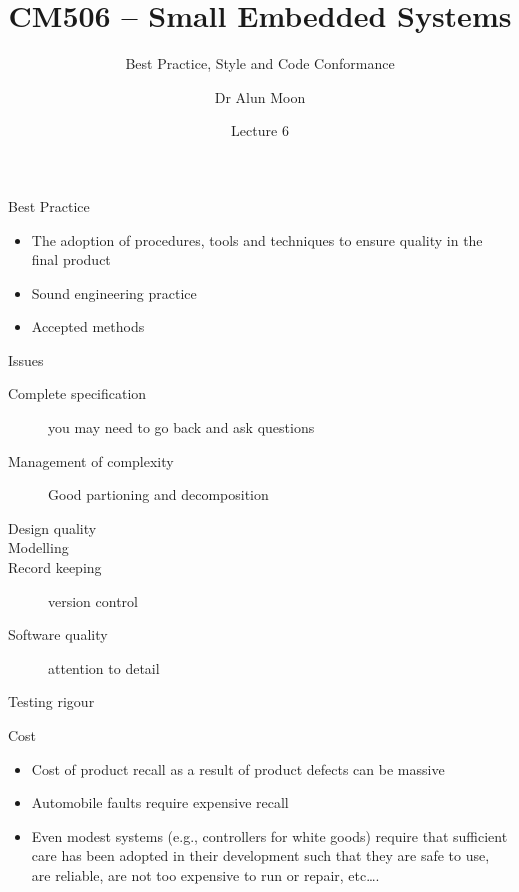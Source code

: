 \documentclass{beamer}
\title{CM506 -- Small Embedded Systems}
\subtitle{Best Practice, Style and Code Conformance}
\author{Dr Alun Moon}
\institute[CSDT]{Department of Computer Science and Digital Technology}
\date{Lecture 6}
\begin{document}
\frame\maketitle


\begin{frame}{Best Practice}
  \begin{itemize}
  \item The adoption of procedures, tools and techniques to
    ensure quality in the final product
  \item Sound engineering practice
  \item Accepted methods
  \end{itemize}
\end{frame}

\begin{frame}{Issues}
  \begin{description}
  \item[Complete specification] you may need to go back and ask questions
  \item[Management of complexity] Good partioning and decomposition
  \item[Design quality]
  \item[Modelling]
  \item[Record keeping]  version control
  \item[Software quality]  attention to detail
  \item[Testing rigour]
  \end{description}
\end{frame}

\begin{frame}{Cost}
  \begin{itemize}
  \item Cost of product recall as a result of product defects
    can be massive
  \item Automobile faults require expensive recall
  \item Even modest systems (e.g., controllers for white goods)
    require that sufficient care has been adopted in their development
    such that they are safe to use, are reliable, are not too
    expensive to run or repair, etc….
  \end{itemize}
\end{frame}
\end{document}
